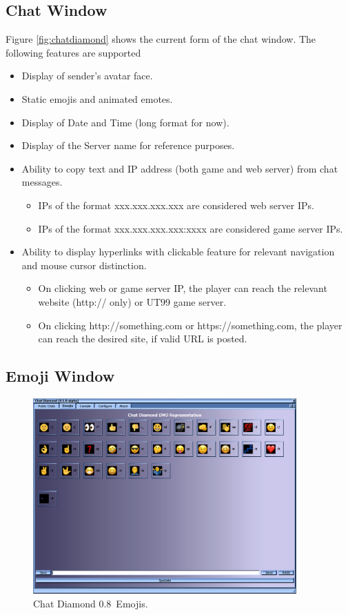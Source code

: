 \documentclass{article}
\theoremstyle{definition}
\newcommand{\ChatDiamondVersion}{0.8}
\begin{document}
\subsection{Chat Window}
\label{sec:chatwindow}
Figure \ref{fig:chatdiamond} shows the current form of the chat window. The following features are supported
\begin{itemize}
\item Display of sender's avatar face.
\item Static emojis and animated emotes.
\item Display of Date and Time (long format for now).
\item Display of the Server name for reference purposes.
\item Ability to copy text and IP address (both game and web server) from chat messages.
\begin{itemize}
\item IPs of the format xxx.xxx.xxx.xxx are considered web server IPs.
\item IPs of the format xxx.xxx.xxx.xxx:xxxx are considered game server IPs.
\end{itemize}
\item Ability to display hyperlinks with clickable feature for relevant navigation and mouse cursor distinction.
\begin{itemize}
\item On clicking web or game server IP, the player can reach the relevant website (http:// only) or UT99 game server.
\item On clicking http://something.com or https://something.com, the player can reach the desired site, if valid URL is posted.
\end{itemize}
\end{itemize}

\subsection{Emoji Window}

\begin{figure}
\centering
\includegraphics[width=0.9\textwidth]{img_emos}
\caption{Chat Diamond \ChatDiamondVersion~Emojis.}
\label{fig:chatdiamond_emos}
\end{figure}
\end{document}
